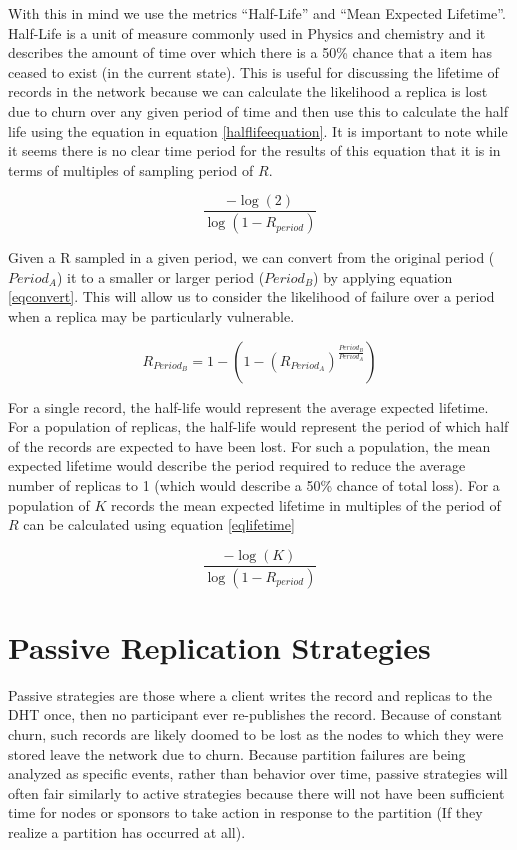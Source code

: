 \documentclass[conference]{IEEEtran}
\begin{document}
With this in mind we use the metrics ``Half-Life'' and ``Mean Expected Lifetime''.
Half-Life is a unit of measure commonly used in Physics and chemistry and it describes the amount of time over which there is a 50\% chance that a item has ceased to exist (in the current state).
This is useful for discussing the lifetime of records in the network because we can calculate the likelihood a replica is lost due to churn over any given period of time and then use this to calculate the half life using the equation in equation \ref{halflifeequation}.
It is important to note while it seems there is no clear time period for the results of this equation that it is in terms of multiples of sampling period of $R$.

\begin{equation}
\frac{-\log(2)}{\log(1-R_{period})}
\label{halflifeequation}
\end{equation}

Given a R sampled in a given period, we can convert from the original period ($Period_{A}$) it to a smaller or larger period ($Period_{B}$) by applying equation \ref{eqconvert}.
This will allow us to consider the likelihood of failure over a period when a replica may be particularly vulnerable.

\begin{equation}
R_{Period_{B}}=1-(1-(R_{Period_{A}})^{\frac{Period_{B}}{Period_{A}}})
\label{eqconvert}
\end{equation}
 
For a single record, the half-life would represent the average expected lifetime.
For a population of replicas, the half-life would represent the period of which half of the records are expected to have been lost.
For such a population, the mean expected lifetime would describe the period required to reduce the average number of replicas to 1 (which would describe a 50\% chance of total loss).
For a population of $K$ records the mean expected lifetime in multiples of the period of $R$ can be calculated using equation \ref{eqlifetime}

\begin{equation}
\frac{-\log(K)}{\log(1-R_{period})}
\label{eqlifetime}
\end{equation}


\section{Passive Replication Strategies}

Passive strategies are those where a client writes the record and replicas to the DHT once, then no participant ever re-publishes the record.
Because of constant churn, such records are likely doomed to be lost as the nodes to which they were stored leave the network due to churn.
Because partition failures are being analyzed as specific events, rather than behavior over time, passive strategies will often fair similarly to active strategies because there will not have been sufficient time for nodes or sponsors to take action in response to the partition (If they realize a partition has occurred at all).
\end{document}
